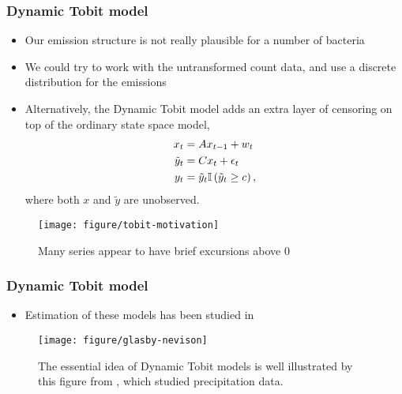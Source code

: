 \documentclass{beamer}
\begin{document}
\begin{frame}
  \frametitle{Dynamic Tobit model}
 \begin{itemize}
 \item Our emission structure is not really plausible for a number of bacteria
 \item We could try to work with the untransformed count data, and use a
   discrete distribution for the emissions
  \item Alternatively, the Dynamic Tobit model adds an extra layer of censoring
    on top of the ordinary state space model,
    \begin{align*}
      x_{t} &= Ax_{t - 1} + w_{t} \\
      \tilde{y}_{t} &= Cx_{t} + \epsilon_{t} \\
      y_{t} &= \tilde{y}_{t} \mathbb{I}\left({\tilde{y}_{t} \geq c}\right),
    \end{align*}
    where both $x$ and $\tilde{y}$ are unobserved.
 \end{itemize} 
\begin{figure}[ht]
  \centering
  \texttt{[image: figure/tobit-motivation]}
  \caption{Many series appear to have brief excursions above 0 \label{fig:label}}
\end{figure}
\end{frame}

\begin{frame}
  \frametitle{Dynamic Tobit model}
  \begin{itemize}
  \item Estimation of these models has been studied in \citep{chib1992bayes,
    manrique1998simulation, andrieu2002particle}
  \end{itemize}
 \begin{figure}[ht]
   \centering
   \texttt{[image: figure/glasby-nevison]}
   \caption{The essential idea of Dynamic Tobit models is well illustrated by
     this figure from \citep{glasbey1997rainfall}, which studied precipitation
     data. \label{fig:glasby-nevison}}
 \end{figure}
 
\end{frame}


 
\end{document}
